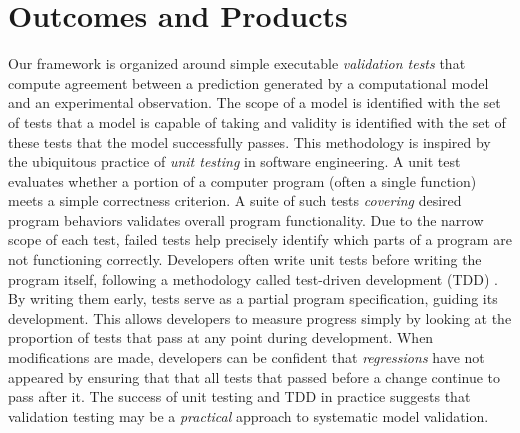 \documentclass[11pt,letterpaper]{article}
\begin{document}
\section{Outcomes and Products}
Our framework is organized around simple executable \emph{validation tests} that compute agreement between a prediction generated by a computational model and an experimental observation. The scope of a model is identified with the set of tests that a model is capable of taking and validity is identified with the set of these tests that the model successfully passes. This methodology is inspired by the ubiquitous practice of \emph{unit testing} in software engineering. A unit test evaluates whether a portion of a computer program (often a single function) meets a simple correctness criterion. A suite of such tests \emph{covering} desired program behaviors validates overall program functionality. Due to the narrow scope of each test, failed tests help precisely identify which parts of a program are not functioning correctly. Developers often write unit tests before writing the program itself, following a methodology called test-driven development (TDD) \cite{beck2003}. By writing them early, tests serve as a partial program specification, guiding its development. This allows developers to measure progress simply by looking at the proportion of tests that pass at any point during development. When modifications are made, developers can be confident that \emph{regressions} have not appeared by ensuring that that all tests that passed before a change continue to pass after it.  The success of unit testing and TDD in practice suggests that validation testing may be a \emph{practical} approach to systematic model validation. 
\end{document}

